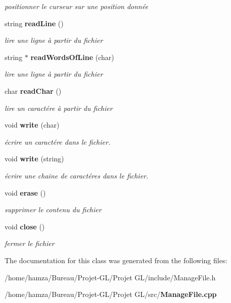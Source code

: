\begin{DoxyCompactItemize}
\begin{DoxyCompactList}\small\item\em positionner le curseur sur une position donnée \end{DoxyCompactList}\item 
string {\bf read\+Line} ()\label{class_manage_file_acbb4cb80a8095b07eef0ac1e7158609e}

\begin{DoxyCompactList}\small\item\em lire une ligne à partir du fichier \end{DoxyCompactList}\item 
string $\ast$ {\bf read\+Words\+Of\+Line} (char)\label{class_manage_file_a6a381faaf02f1ae91977ac96559ade86}

\begin{DoxyCompactList}\small\item\em lire une ligne à partir du fichier \end{DoxyCompactList}\item 
char {\bf read\+Char} ()\label{class_manage_file_a1e108ebc91f037f6626b930a8bb4b48a}

\begin{DoxyCompactList}\small\item\em lire un caractére à partir du fichier \end{DoxyCompactList}\item 
void {\bf write} (char)\label{class_manage_file_a70b2f89264df559b4afffb9e9ca01294}

\begin{DoxyCompactList}\small\item\em écrire un caractére dans le fichier. \end{DoxyCompactList}\item 
void {\bf write} (string)\label{class_manage_file_a74d2447d683ae9d6735ce49082940eb9}

\begin{DoxyCompactList}\small\item\em écrire une chaine de caractéres dans le fichier. \end{DoxyCompactList}\item 
void {\bf erase} ()\label{class_manage_file_a484495090715696f5cbda5c543f48237}

\begin{DoxyCompactList}\small\item\em supprimer le contenu du fichier \end{DoxyCompactList}\item 
void {\bf close} ()\label{class_manage_file_a8eb66054851cb3752ded544b001df4f0}

\begin{DoxyCompactList}\small\item\em fermer le fichier \end{DoxyCompactList}\end{DoxyCompactItemize}


The documentation for this class was generated from the following files\+:\begin{DoxyCompactItemize}
\item 
/home/hamza/\+Bureau/\+Projet-\/\+G\+L/\+Projet G\+L/include/Manage\+File.\+h\item 
/home/hamza/\+Bureau/\+Projet-\/\+G\+L/\+Projet G\+L/src/{\bf Manage\+File.\+cpp}\end{DoxyCompactItemize}
